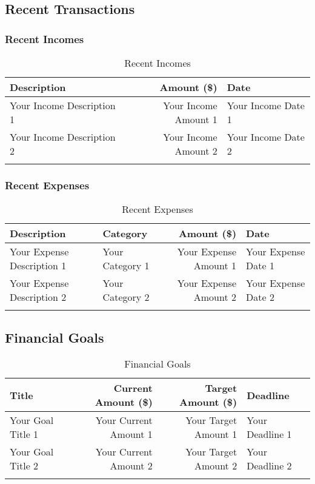 \documentclass[a4paper,12pt]{article}
\begin{document}
\subsection{Recent Transactions}
\subsubsection{Recent Incomes}
\begin{longtable}{p{5cm} r p{3cm}}
    \toprule
    \textbf{Description} & \textbf{Amount (\$)} & \textbf{Date} \\
    \midrule
    \endhead
    Your Income Description 1 & Your Income Amount 1 & Your Income Date 1 \\
    Your Income Description 2 & Your Income Amount 2 & Your Income Date 2 \\
    \bottomrule
    \caption{Recent Incomes}
    \label{tab:recent_incomes}
\end{longtable}

\subsubsection{Recent Expenses}
\begin{longtable}{p{4cm} p{3cm} r p{3cm}}
    \toprule
    \textbf{Description} & \textbf{Category} & \textbf{Amount (\$)} & \textbf{Date} \\
    \midrule
    \endhead
    Your Expense Description 1 & Your Category 1 & Your Expense Amount 1 & Your Expense Date 1 \\
    Your Expense Description 2 & Your Category 2 & Your Expense Amount 2 & Your Expense Date 2 \\
    \bottomrule
    \caption{Recent Expenses}
    \label{tab:recent_expenses}
\end{longtable}

\subsection{Financial Goals}
\begin{longtable}{p{4cm} r r p{3cm}}
    \toprule
    \textbf{Title} & \textbf{Current Amount (\$)} & \textbf{Target Amount (\$)} & \textbf{Deadline} \\
    \midrule
    \endhead
    Your Goal Title 1 & Your Current Amount 1 & Your Target Amount 1 & Your Deadline 1 \\
    Your Goal Title 2 & Your Current Amount 2 & Your Target Amount 2 & Your Deadline 2 \\
    \bottomrule
    \caption{Financial Goals}
    \label{tab:financial_goals}
\end{longtable}
\end{document}

